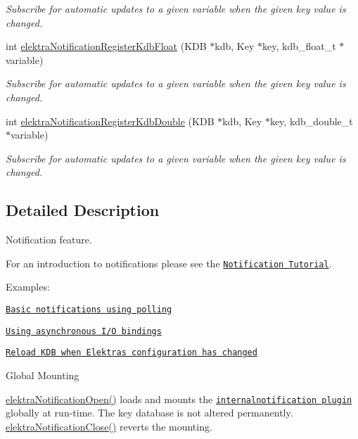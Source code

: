 \begin{DoxyCompactItemize}
\begin{DoxyCompactList}\small\item\em Subscribe for automatic updates to a given variable when the given key value is changed. \end{DoxyCompactList}\item 
int \hyperlink{group__kdbnotification_ga6c83faa92467ece80470e7898dc7d08b}{elektra\+Notification\+Register\+Kdb\+Float} (K\+DB $\ast$kdb, Key $\ast$key, kdb\+\_\+float\+\_\+t $\ast$variable)
\begin{DoxyCompactList}\small\item\em Subscribe for automatic updates to a given variable when the given key value is changed. \end{DoxyCompactList}\item 
int \hyperlink{group__kdbnotification_ga99a142068ed614d7cb8b177e3b6920e4}{elektra\+Notification\+Register\+Kdb\+Double} (K\+DB $\ast$kdb, Key $\ast$key, kdb\+\_\+double\+\_\+t $\ast$variable)
\begin{DoxyCompactList}\small\item\em Subscribe for automatic updates to a given variable when the given key value is changed. \end{DoxyCompactList}\end{DoxyCompactItemize}


\subsection{Detailed Description}
Notification feature. 

For an introduction to notifications please see the \href{doc_tutorials_notifications_md.html}{\tt Notification Tutorial}.

Examples\+:


\begin{DoxyItemize}
\item \href{https://www.libelektra.org/examples/notificationpolling}{\tt Basic notifications using polling}
\item \href{https://www.libelektra.org/examples/notificationasync}{\tt Using asynchronous I/O bindings}
\item \href{https://www.libelektra.org/examples/notificationreload}{\tt Reload K\+DB when Elektra\textquotesingle{}s configuration has changed}
\end{DoxyItemize}

\begin{DoxyParagraph}{Global Mounting}

\end{DoxyParagraph}
\hyperlink{group__kdbnotification_gaeae96154abdb5fdbf1b34a01e2b23e44}{elektra\+Notification\+Open()} loads and mounts the \href{https://www.libelektra.org/plugins/internalnotification}{\tt internalnotification plugin} globally at run-\/time. The key database is not altered permanently. \hyperlink{group__kdbnotification_ga5685dafbd4131011365628d6d9213594}{elektra\+Notification\+Close()} reverts the mounting.

